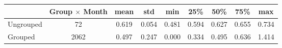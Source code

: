 \begin{tabular}{lcccccccc}
\toprule
{} &  Group $ \times$ Month &   mean &    std &    min &    25\% &    50\% &    75\% &    max \\
\midrule
Ungrouped &                    72 &  0.619 &  0.054 &  0.481 &  0.594 &  0.627 &  0.655 &  0.734 \\
Grouped   &                  2062 &  0.497 &  0.247 &  0.000 &  0.334 &  0.495 &  0.636 &  1.414 \\
\bottomrule
\end{tabular}
